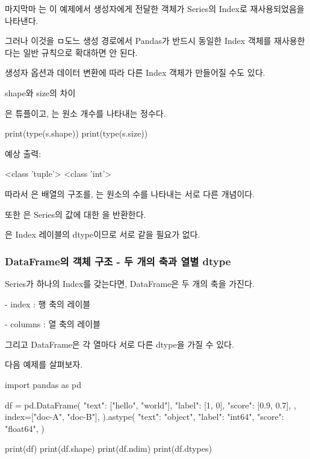 마지막마 는 이 예제에서 생성자에게 전달한  객체가 Series의 Index로 재사용되었음을 나타낸다.

그러나 이것을 ㅁ도느 생성 경로에서 Pandas가 반드시 동일한 Index 객체를 재사용한다는 일반 규칙으로 확대하면 안 된다.

생성자 옵션과 데이터 변환에 따라 다른 Index 객체가 만들어질 수도 있다.

\begin{dhknote}
\begin{dhksmry}[centered]
shape와 size의 차이
\end{dhksmry}
\end{dhknote}

은 튜플이고, 는 원소 개수를 나타내는 정수다.

\begin{dhkcode}
print(type(s.shape))
print(type(s.size))
\end{dhkcode}

예상 출력:

\begin{dhkzsh}
<class 'tuple'>
<class 'int'>
\end{dhkzsh}

따라서 은 배열의 구조를, 는 원소의 수를 나타내는 서로 다른 개념이다.

또한 은 Series의 값에 대한 을 반환한다.

은 Index 레이블의 dtype이므로 서로 같을 필요가 없다.

\subsubsection{DataFrame의 객체 구조 - 두 개의 축과 열별 dtype}

Series가 하나의 Index를 갖는다면, DataFrame은 두 개의 축을 가진다.

\begin{dhksmry}
    - index : 행 축의 레이블

    - columns : 열 축의 레이블
\end{dhksmry}

그리고 DataFrame은 각 열마다 서로 다른 dtype을 가질 수 있다.

다음 예제를 살펴보자.

\begin{dhkcode}
import pandas as pd

df = pd.DataFrame(
    {
        "text": ["hello", "world"],
        "label": [1, 0],
        "score": [0.9, 0.7],
    },
    index=["doc-A", "doc-B"],
).astype({
    "text": "object",
    "label": "int64",
    "score": "float64",
})

print(df)
print(df.shape)
print(df.ndim)
print(df.dtypes)
\end{dhkcode}

